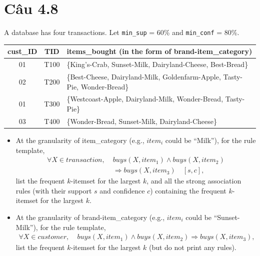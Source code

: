 \section{Câu 4.8}
A database has four transactions. Let \texttt{min\_sup} = 60\% and \texttt{min\_conf} = 80\%.

\begin{center}
    \begin{tabularx}{\linewidth}{|c|c|X|}
        \hline
        cust\_ID & TID  & items\_bought (in the form of brand-item\_category)                        \\
        \hline
        01       & T100 & \{King's-Crab, Sunset-Milk, Dairyland-Cheese, Best-Bread\}                 \\
        02       & T200 & \{Best-Cheese, Dairyland-Milk, Goldenfarm-Apple, Tasty-Pie, Wonder-Bread\} \\
        01       & T300 & \{Westcoast-Apple, Dairyland-Milk, Wonder-Bread, Tasty-Pie\}               \\
        03       & T400 & \{Wonder-Bread, Sunset-Milk, Dairyland-Cheese\}                            \\
        \hline
    \end{tabularx}
\end{center}

\begin{itemize}
    \item[a.] At the granularity of item\_category (e.g., $item_i$ could be ``Milk''), for the rule template,
          \[
              \begin{aligned}
                  \forall X \in transaction,\; & buys(X,item_1) \land buys(X,item_2)    \\
                                               & \Rightarrow buys(X,item_3)\quad [s,c],
              \end{aligned}
          \]
          list the frequent $k$-itemset for the largest $k$, and all the strong association rules (with their support $s$ and confidence $c$) containing the frequent $k$-itemset for the largest $k$.
    \item[b.] At the granularity of brand-item\_category (e.g., $item_i$ could be ``Sunset-Milk''), for the rule template,
          \[
              \begin{aligned}
                  \forall X \in customer,\; & buys(X,item_1) \land buys(X,item_2) \Rightarrow buys(X,item_3),
              \end{aligned}
          \]
          list the frequent $k$-itemset for the largest $k$ (but do not print any rules).
\end{itemize}

